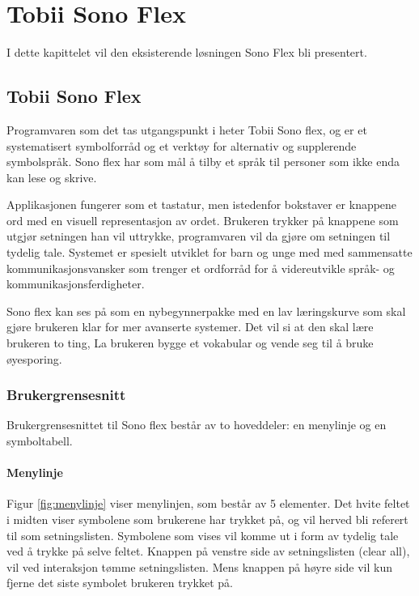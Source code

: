 

\chapter{Tobii Sono Flex}
I dette kapittelet vil den eksisterende løsningen Sono Flex bli presentert. 

\section{Tobii Sono Flex}
\label{chap:Tobii-Sono-Flex}

Programvaren som det tas utgangspunkt i heter Tobii Sono flex,  og er et systematisert symbolforråd og et verktøy for alternativ og supplerende symbolspråk. Sono flex har som mål å tilby et språk til personer som ikke enda kan lese og skrive. 

Applikasjonen fungerer som et tastatur, men istedenfor bokstaver er knappene ord med en visuell representasjon av ordet. Brukeren trykker på knappene som utgjør setningen han vil uttrykke,  programvaren vil da gjøre om setningen til tydelig tale. Systemet er spesielt utviklet for barn og unge med med sammensatte kommunikasjonsvansker som trenger et ordforråd for å videreutvikle språk- og kommunikasjonsferdigheter. 

Sono flex kan ses på som en nybegynnerpakke med en lav læringskurve som skal gjøre brukeren klar for mer avanserte systemer. Det vil si at den skal lære brukeren to ting, La brukeren bygge et vokabular og vende seg til å bruke øyesporing.


\subsection{Brukergrensesnitt}

Brukergrensesnittet til Sono flex består av to hoveddeler: en menylinje og en symboltabell. 


\subsubsection{Menylinje}

Figur \ref{fig:menylinje} viser menylinjen, som består av 5 elementer. Det hvite feltet i midten viser symbolene som brukerene har trykket på, og vil herved bli referert til som setningslisten. Symbolene som vises vil komme ut i form av tydelig tale ved å trykke på selve feltet. Knappen på venstre side av setningslisten (clear all), vil ved interaksjon tømme setningslisten. Mens knappen på høyre side vil kun fjerne det siste symbolet brukeren trykket på.


